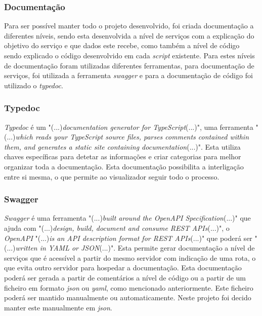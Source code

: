 \subsubsection{Documentação}
Para ser possível manter todo o projeto desenvolvido, foi criada documentação a diferentes níveis, sendo esta desenvolvida a nível de serviços com a explicação do objetivo do serviço e que dados este recebe, como também a nível de código sendo explicado o código desenvolvido em cada \textit{script} existente. Para estes níveis de documentação foram utilizadas diferentes ferramentas, para documentação de serviços, foi utilizada a ferramenta \textit{swagger} e para a documentação de código foi utilizado o \textit{typedoc}.

\subsubsection{Typedoc}

\textit{Typedoc} é um "(...)\emph{documentation generator for TypeScript}(...)"\citep{typedoc}, uma ferramenta "(...)\emph{which reads your TypeScript source files, parses comments contained within them, and generates a static site containing documentation}(...)"\citep{typedoc}. Esta utiliza chaves específicas para detetar as informações e criar categorias para melhor organizar toda a documentação. Esta documentação possibilita a interligação entre si mesma, o que permite ao visualizador seguir todo o processo.

\newpage

\subsubsection{Swagger}

\textit{Swagger} é uma ferramenta "(...)\emph{built around the OpenAPI Specification}(...)"\citep{swagger} que ajuda com "(...)\emph{design, build, document and consume REST APIs}(...)"\citep{swagger}, o \emph{OpenAPI} "(...)\emph{is an API description format for REST APIs}(...)"\citep{swagger} que poderá ser "(...)\emph{written in YAML or JSON}(...)"\citep{swagger}. Esta permite gerar documentação a nível de serviços que é acessível a partir do mesmo servidor com indicação de uma rota, o que evita outro servidor para hospedar a documentação. Esta documentação poderá ser gerada a partir de comentários a nível de código ou a partir de um ficheiro em formato \textit{\acrshort{json}} ou \textit{\acrshort{yaml}}, como mencionado anteriormente. Este ficheiro poderá ser mantido manualmente ou automaticamente. Neste projeto foi decido manter este manualmente em \textit{\acrshort{json}}.